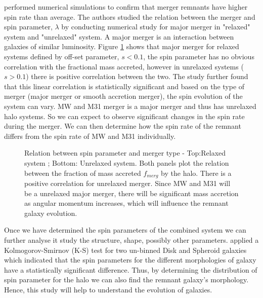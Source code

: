 \documentclass[twocolumn]{aastex631}
\begin{document}
\citet{D'Onghia2007} performed numerical simulations to confirm that merger remnants have higher spin rate than average. The authors studied the relation between the merger and spin parameter, $\lambda$ by conducting numerical study for major merger in "relaxed" system and "unrelaxed" system. A major merger is an interaction between galaxies of similar luminosity. Figure \ref{fig:spin_para} shows that major merger for relaxed systems defined by off-set parameter, $s<0.1$, the spin parameter has no obvious correlation with the fractional mass accreted, however in unrelaxed systems ($s>0.1$) there is positive correlation between the two. The study further found that this linear correlation is statistically significant and based on the type of merger (major merger or smooth accretion merger), the spin evolution of the system can vary. MW and M31 merger is a major merger and thus has unrelaxed halo systems. So we can expect to observe significant changes in the spin rate during the merger. We can then determine how the spin rate of the remnant differs from the spin rate of MW and M31 individually.\\

\begin{figure}[H]
\caption{Relation between spin parameter and merger type \citep{D'Onghia2007} - Top:Relaxed system ; Bottom: Unrelaxed system. Both panels plot the relation between the fraction of mass accreted $f_{merg}$ by the halo. There is a positive correlation for unrelaxed merger. Since MW and M31 will be a unrelaxed major merger, there will be significant mass accretion as angular momentum increases, which will influence the remnant galaxy evolution. 
\label{fig:spin_para}}
\end{figure}

Once we have determined the spin parameters of the combined system we can further analyse it study the structure, shape, possibly other parameters. \citet{Teklu2015} applied a Kolmogorov-Smirnov (K-S) test for two un-binned Disk and Spheroid galaxies which indicated that the spin parameters for the different morphologies of galaxy have a statistically significant difference. Thus, by determining the distribution of spin parameter for the halo we can also find the remnant galaxy's morphology. Hence, this study will help to understand the evolution of galaxies.
\end{document}
